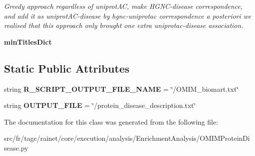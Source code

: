 \begin{DoxyCompactItemize}
\begin{DoxyCompactList}\small\item\em Greedy approach regardless of uniprot\-A\-C, make H\-G\-N\-C-\/disease correspondence, and add it as uniprot\-A\-C-\/disease by hgnc-\/uniprotac correspondence a posteriori we realised that this approach only brought one extra uniprotac-\/disease association. \end{DoxyCompactList}\item 
\hypertarget{classsrc_1_1fr_1_1tagc_1_1rainet_1_1core_1_1execution_1_1analysis_1_1EnrichmentAnalysis_1_1OMIMP2fcd6305da6926c1482af46987449000_abf2cdb5566bf149564e59f322a117417}{{\bfseries min\-Titles\-Dict}}\label{classsrc_1_1fr_1_1tagc_1_1rainet_1_1core_1_1execution_1_1analysis_1_1EnrichmentAnalysis_1_1OMIMP2fcd6305da6926c1482af46987449000_abf2cdb5566bf149564e59f322a117417}

\end{DoxyCompactItemize}
\subsection*{Static Public Attributes}
\begin{DoxyCompactItemize}
\item 
\hypertarget{classsrc_1_1fr_1_1tagc_1_1rainet_1_1core_1_1execution_1_1analysis_1_1EnrichmentAnalysis_1_1OMIMP2fcd6305da6926c1482af46987449000_a74b030805d67566bee8e5e1bc66ee463}{string {\bfseries R\-\_\-\-S\-C\-R\-I\-P\-T\-\_\-\-O\-U\-T\-P\-U\-T\-\_\-\-F\-I\-L\-E\-\_\-\-N\-A\-M\-E} = \char`\"{}/O\-M\-I\-M\-\_\-biomart.\-txt\char`\"{}}\label{classsrc_1_1fr_1_1tagc_1_1rainet_1_1core_1_1execution_1_1analysis_1_1EnrichmentAnalysis_1_1OMIMP2fcd6305da6926c1482af46987449000_a74b030805d67566bee8e5e1bc66ee463}

\item 
\hypertarget{classsrc_1_1fr_1_1tagc_1_1rainet_1_1core_1_1execution_1_1analysis_1_1EnrichmentAnalysis_1_1OMIMP2fcd6305da6926c1482af46987449000_acb5cd15cc2470f9641727a79ccf39497}{string {\bfseries O\-U\-T\-P\-U\-T\-\_\-\-F\-I\-L\-E} = \char`\"{}/protein\-\_\-disease\-\_\-description.\-txt\char`\"{}}\label{classsrc_1_1fr_1_1tagc_1_1rainet_1_1core_1_1execution_1_1analysis_1_1EnrichmentAnalysis_1_1OMIMP2fcd6305da6926c1482af46987449000_acb5cd15cc2470f9641727a79ccf39497}

\end{DoxyCompactItemize}


The documentation for this class was generated from the following file\-:\begin{DoxyCompactItemize}
\item 
src/fr/tagc/rainet/core/execution/analysis/\-Enrichment\-Analysis/O\-M\-I\-M\-Protein\-Disease.\-py\end{DoxyCompactItemize}
